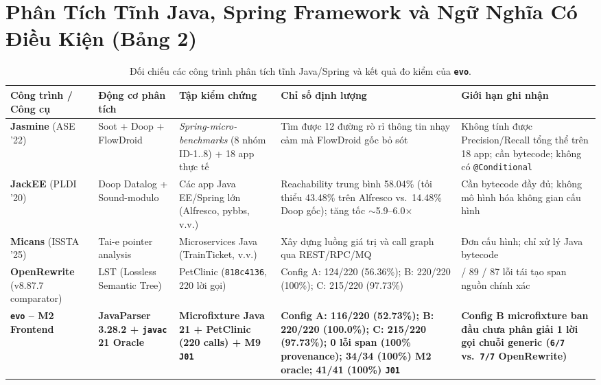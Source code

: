 \documentclass[10pt,a4paper]{article}
\begin{document}
\section{Phân Tích Tĩnh Java, Spring Framework và Ngữ Nghĩa Có Điều Kiện (Bảng 2)}

\begin{table}[htbp]
\centering
\caption{Đối chiếu các công trình phân tích tĩnh Java/Spring và kết quả đo kiểm của \textbf{\texttt{evo}}.}
\label{tab:spring}
\scriptsize
\renewcommand{\arraystretch}{1.25}
\begin{tabularx}{\textwidth}{>{\raggedright\arraybackslash}p{2.7cm} >{\raggedright\arraybackslash}p{2.4cm} >{\raggedright\arraybackslash}p{3.0cm} >{\raggedright\arraybackslash}X >{\raggedright\arraybackslash}p{3.5cm}}
\toprule
\textbf{Công trình / Công cụ} & \textbf{Động cơ phân tích} & \textbf{Tập kiểm chứng} & \textbf{Chỉ số định lượng} & \textbf{Giới hạn ghi nhận} \\
\midrule
\textbf{Jasmine} (ASE '22) \cite{chen2022jasmine} & Soot + Doop + FlowDroid & \emph{Spring-micro-benchmarks} (8 nhóm ID-1..8) + 18 app thực tế & Tìm được 12 đường rò rỉ thông tin nhạy cảm mà FlowDroid gốc bỏ sót & Không tính được Precision/Recall tổng thể trên 18 app; cần bytecode; không có \texttt{@Conditional} \\
\textbf{JackEE} (PLDI '20) \cite{antoniadis2020jackee} & Doop Datalog + Sound-modulo & Các app Java EE/Spring lớn (Alfresco, pybbs, v.v.) & Reachability trung bình 58.04\% (tối thiểu 43.48\% trên Alfresco vs.\ 14.48\% Doop gốc); tăng tốc $\sim$5.9--6.0$\times$ & Cần bytecode đầy đủ; không mô hình hóa không gian cấu hình \\
\textbf{Micans} (ISSTA '25) \cite{zhang2025micans} & Tai-e pointer analysis & Microservices Java (TrainTicket, v.v.) & Xây dựng luồng giá trị và call graph qua REST/RPC/MQ & Đơn cấu hình; chỉ xử lý Java bytecode \\
\textbf{OpenRewrite} (v8.87.7 comparator) & LST (Lossless Semantic Tree) & PetClinic (\texttt{818c4136}, 220 lời gọi) & Config A: 124/220 (56.36\%); B: 220/220 (100\%); C: 215/220 (97.73\%) & 57 / 89 / 87 lỗi tái tạo span nguồn chính xác \\
\textbf{\texttt{evo} -- M2 Frontend} & \textbf{JavaParser 3.28.2 + \texttt{javac} 21 Oracle} & \textbf{Microfixture Java 21 + PetClinic (220 calls) + M9 \texttt{J01}} & \textbf{Config A: 116/220 (52.73\%); B: 220/220 (100.0\%); C: 215/220 (97.73\%); 0 lỗi span (100\% provenance); 34/34 (100\%) M2 oracle; 41/41 (100\%) \texttt{J01}} & \textbf{Config B microfixture ban đầu chưa phân giải 1 lời gọi chuỗi generic (\texttt{6/7} vs.\ \texttt{7/7} OpenRewrite)} \\

\end{tabularx}
\end{table}
\end{document}
